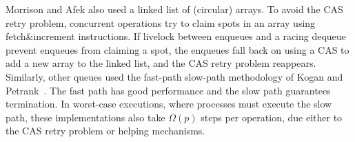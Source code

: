Morrison and Afek \cite{DBLP:conf/ppopp/MorrisonA13} also used a linked list of (circular) arrays.
To avoid the CAS retry problem, concurrent operations try to claim spots in an array using fetch\&increment instructions.
If livelock between enqueues and a racing dequeue prevent enqueues from claiming a spot,
the enqueues fall back on using a CAS to add a new array to the linked list, 
and the CAS retry problem reappears.
Similarly,
other queues \cite{Nik19,10.1145/3490148.3538572,DBLP:conf/ppopp/YangM16} used the fast-path slow-path methodology of Kogan and Petrank~\cite{10.1145/2370036.2145835}.
The fast path has good performance and the slow path guarantees
termination.
In worst-case executions, where processes must execute the slow path,
these implementations also take $\Omega(p)$ steps per operation, 
due either to the CAS retry problem or helping mechanisms.





